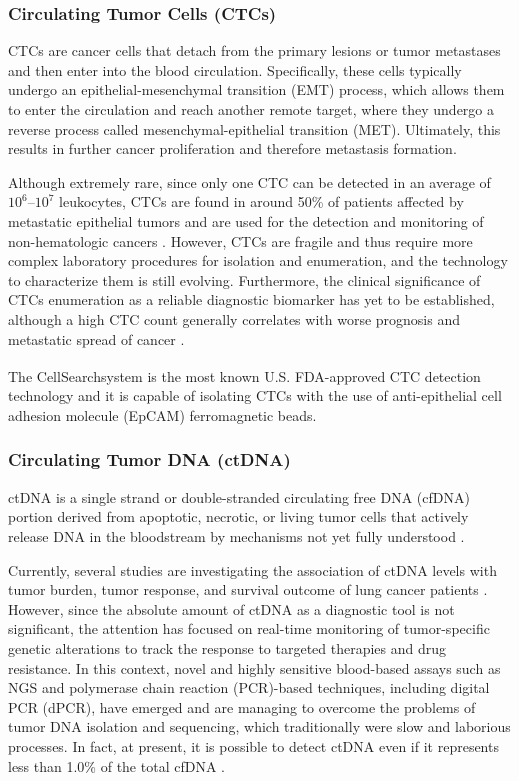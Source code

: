 \subsubsection{Circulating Tumor Cells (CTCs)}

CTCs are cancer cells that detach from the primary lesions or tumor metastases and then enter into the blood circulation. Specifically, these cells typically undergo an epithelial-mesenchymal transition (EMT) process, which allows them to enter the circulation and reach another remote target, where they undergo a reverse process called mesenchymal-epithelial transition (MET). Ultimately, this results in further cancer proliferation and therefore metastasis formation.

Although extremely rare, since only one CTC can be detected in an average of $10^6$–$10^7$ leukocytes, CTCs are found in around 50\% of patients affected by metastatic epithelial tumors and are used for the detection and monitoring of non-hematologic cancers \cite{CTC_prognosis, CTC_blood}. However, CTCs are fragile and thus require more complex laboratory procedures for isolation and enumeration, and the technology to characterize them is still evolving. Furthermore, the clinical significance of CTCs enumeration as a reliable diagnostic biomarker has yet to be established, although a high CTC count generally correlates with worse prognosis and metastatic spread of cancer \cite{CTC_prognosis}.

The CellSearch\textsuperscript\textregistered system is the most known U.S. FDA-approved CTC detection technology and it is capable of isolating CTCs with the use of anti-epithelial cell adhesion molecule (EpCAM) ferromagnetic beads.

\subsubsection{Circulating Tumor DNA (ctDNA)}

ctDNA is a single strand or double-stranded circulating free DNA (cfDNA) portion derived from apoptotic, necrotic, or living tumor cells that actively release DNA in the bloodstream by mechanisms not yet fully understood \cite{ctDNA}. 

Currently, several studies are investigating the association of ctDNA levels with tumor burden, tumor response, and survival outcome of lung cancer patients \cite{ctDNA, ctDNA_NSCLC}. However, since the absolute amount of ctDNA as a diagnostic tool is not significant, the attention has focused on real-time monitoring of tumor-specific genetic alterations to track the response to targeted therapies and drug resistance. In this context, novel and highly sensitive blood-based assays such as NGS and polymerase chain reaction (PCR)-based techniques, including digital PCR (dPCR), have emerged and are managing to overcome the problems of tumor DNA isolation and sequencing, which traditionally were slow and laborious processes. In fact, at present, it is possible to detect ctDNA even if it represents less than 1.0\% of the total cfDNA \cite{ctDNA_NSCLC, ctDNA_LB}.

